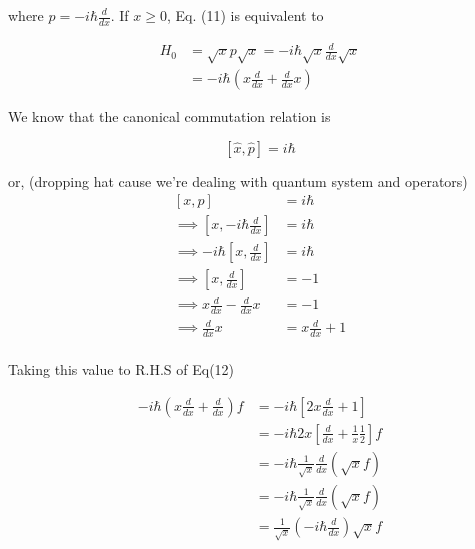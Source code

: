 \documentclass[12pt, letterpaper]{article}
\newcommand*{\1}{\hspace{1pt}}
\begin{document}
        where $p = -i\hbar \frac{d}{dx}$. If $x\geqslant 0$, Eq. (11) is equivalent to

        \begin{equation}
            \begin{split}
                H_{0} &= \sqrt{x} p \sqrt{x} = -i\hbar \sqrt{x} \frac{d}{dx} \sqrt{x}\\ 
                &= -i\hbar\left(x\frac{d}{dx}+\frac{d}{dx}x\right)
            \end{split}
        \end{equation}

        We know that the canonical commutation relation is 
        
        \begin{equation}
            \left[\hat{x},\hat{p}\right] = i\hbar
        \end{equation}
        
        or, (dropping hat cause we're dealing with quantum system and operators)
        \begin{equation}
            \begin{split}
                \left[x,p\right] &= i\hbar \\ 
                \implies \left[x,-i\hbar\frac{d}{dx}\right] &= i\hbar \\
                \implies -i\hbar\left[x,\frac{d}{dx}\right] &= i\hbar \\
                \implies \left[x,\frac{d}{dx}\right] &= -1 \\
                \implies x\frac{d}{dx} - \frac{d}{dx}x &= -1 \\
                \implies  \frac{d}{dx}x &= x\frac{d}{dx} + 1 \\
            \end{split}
        \end{equation}

        Taking this value to R.H.S of Eq(12)

        \begin{equation}
            \begin{split}
                -i\hbar\left(x\frac{d}{dx} + \frac{d}{dx}\right)f &= -i\hbar\left[2x\frac{d}{dx}+1\right] \\ 
                & = -i\hbar2x\left[\frac{d}{dx}+\frac{1}{x}\frac{1}{2}\right]f \\ 
                & =  -i\hbar\frac{1}{\sqrt{x}}\frac{d}{dx}\left(\sqrt{x}f\right) \\ 
                & =  -i\hbar\frac{1}{\sqrt{x}}\frac{d}{dx}\left(\sqrt{x}f\right) \\ 
                & =  \frac{1}{\sqrt{x}}\left(-i\hbar\frac{d}{dx}\right)\sqrt{x}f \\ 
            \end{split}
        \end{equation}
\end{document}
